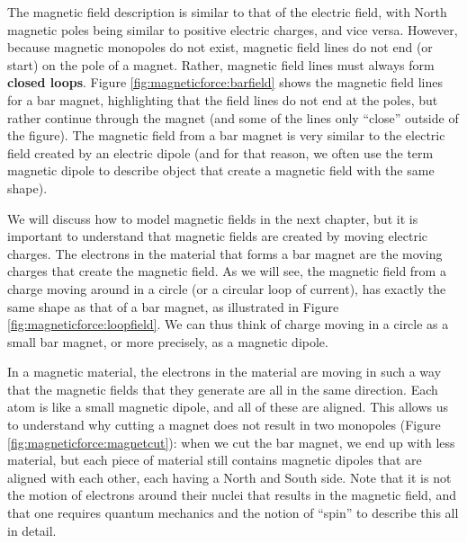 The magnetic field description is similar to that of the electric field, with North magnetic poles being similar to positive electric charges, and vice versa.  However, because magnetic monopoles do not exist, magnetic field lines do not end (or start) on the pole of a magnet. Rather, magnetic field lines must always form \textbf{closed loops}. Figure \ref{fig:magneticforce:barfield} shows the magnetic field lines for a bar magnet, highlighting that the field lines do not end at the poles, but rather continue through the magnet (and some of the lines only ``close'' outside of the figure). The magnetic field from a bar magnet is very similar to the electric field created by an electric dipole (and for that reason, we often use the term magnetic dipole to describe object that create a magnetic field with the same shape).

We will discuss how to model magnetic fields in the next chapter, but it is important to understand that magnetic fields are created by moving electric charges. The electrons in the material that forms a bar magnet are the moving charges that create the magnetic field. As we will see, the magnetic field from a charge moving around in a circle (or a circular loop of current), has exactly the same shape as that of a bar magnet, as illustrated in Figure \ref{fig:magneticforce:loopfield}. We can thus think of charge moving in a circle as a small bar magnet, or more precisely, as a magnetic dipole.


In a magnetic material, the electrons in the material are moving in such a way that the magnetic fields that they generate are all in the same direction. Each atom is like a small magnetic dipole, and all of these are aligned. This allows us to understand why cutting a magnet does not result in two monopoles (Figure \ref{fig:magneticforce:magnetcut}): when we cut the bar magnet, we end up with less material, but each piece of material still contains magnetic dipoles that are aligned with each other, each having a North and South side. Note that it is not the motion of electrons around their nuclei that results in the magnetic field, and that one  requires quantum mechanics and the notion of ``spin'' to describe this all in detail. 
 
